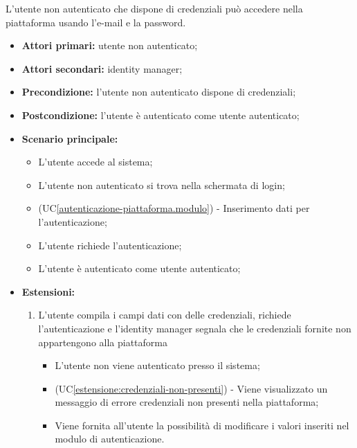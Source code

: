 L'utente non autenticato che dispone di credenziali può accedere nella piattaforma usando l'e-mail e la password.
\begin{itemize}
    \item \textbf{Attori primari:} utente non autenticato;
    \item \textbf{Attori secondari:} identity manager;
    \item \textbf{Precondizione:} l'utente non autenticato dispone di credenziali;
    \item \textbf{Postcondizione:} l'utente è autenticato come utente autenticato;
    \item \textbf{Scenario principale:}
    \begin{itemize}
    	\item L'utente accede al sistema;
    	\item L'utente non autenticato si trova nella schermata di login;
    	\item (UC\ref{autenticazione-piattaforma.modulo}) - Inserimento dati per l'autenticazione;%
    	\item L'utente richiede l'autenticazione;
    	\item L'utente è autenticato come utente autenticato;
    \end{itemize}
	\item \textbf{Estensioni:}
	\begin{enumerate}[label=\lett]
		\item L'utente compila i campi dati con delle credenziali, richiede l'autenticazione e l'identity manager segnala che le credenziali fornite non appartengono alla piattaforma
		\begin{itemize}
			\item L'utente non viene autenticato presso il sistema;
			\item (UC\ref{estensione:credenziali-non-presenti}) - Viene visualizzato un messaggio di errore credenziali non presenti nella piattaforma;
			\item Viene fornita all'utente la possibilità di modificare i valori inseriti nel modulo di autenticazione.
		\end{itemize}
	\end{enumerate} 
\end{itemize}

\label{autenticazione-piattaforma.modulo}

